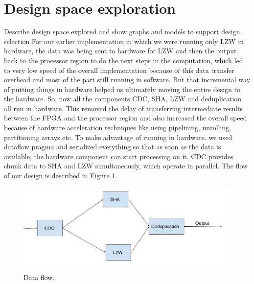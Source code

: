 \documentclass{article}
\begin{document}
\section{Design space exploration}

Describe design space explored and show graphs and models to support design selection
For our earlier implementation in which we were running only LZW in hardware, the data was being sent to hardware for LZW and then the output back to the processor region to do the next steps in the computation, which led to very low speed of the overall implementation because of this data transfer overhead and most of the part still running in software. 
\newline
But that incremental way of putting things in hardware helped us ultimately moving the entire design to the hardware. So, now all the components CDC, SHA, LZW and deduplication all run in hardware. This removed the delay of transferring intermediate results between the FPGA and the processor region and also increased the overall speed because of hardware acceleration techniques like using pipelining, unrolling, partitioning arrays etc.
\newline\newline
To make advantage of running in hardware. we used dataflow pragma and serialized everything so that as soon as the data is available, the hardware component can start processing on it. 
\newline
CDC provides chunk data to SHA and LZW simultaneously, which operate in parallel. The flow of our design is described in Figure 1.
\newline\newline

\begin{figure}[h!]
  \includegraphics[width=\linewidth]{data_flow.jpg}
  \caption{Data flow.}
  \label{fig:data_flow}
\end{figure}
\end{document}
